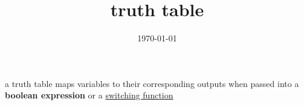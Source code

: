 \documentclass[11pt]{article}
\date{\today}
\title{truth table}
\begin{document}
\maketitle
\tableofcontents

a truth table maps variables to their corresponding outputs when passed into a \textbf{boolean expression} or a \href{boolean_algebra.org}{switching function}
\end{document}
